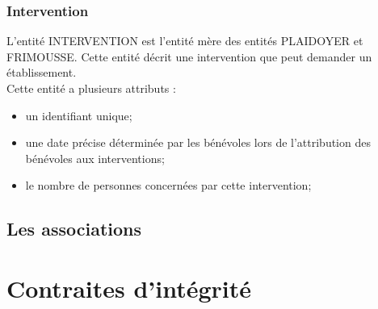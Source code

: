 \documentclass[asi, sansVersion]{picINSA}
\begin{document}
\subsection*{Intervention}
L'entité INTERVENTION est l'entité mère des entités PLAIDOYER et FRIMOUSSE. Cette entité décrit une intervention que peut demander un établissement. \\
Cette entité a plusieurs attributs :
\begin{itemize}
\item un identifiant unique;
\item une date précise déterminée par les bénévoles lors de l'attribution des bénévoles aux interventions;
\item le nombre de personnes concernées par cette intervention;
\end{itemize}

\section{Les associations}

\chapter{Contraites d'intégrité}
\end{document}
